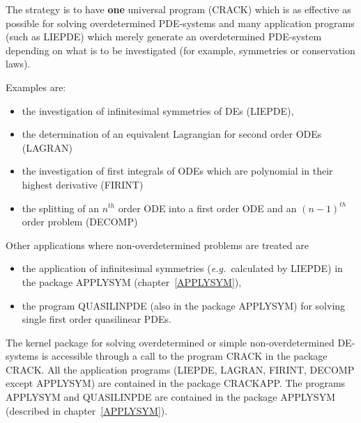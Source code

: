\documentclass[11pt,letterpaper]{book}
\begin{document}
The strategy is to have {\bf one} universal program (CRACK) which
is as effective as possible for solving overdetermined PDE-systems
and many application programs (such as LIEPDE) which merely generate an
overdetermined PDE-system depending on what is to be investigated
(for example, symmetries or conservation laws).

Examples are:
\begin{itemize}
\item the investigation of infinitesimal symmetries of DEs (LIEPDE),
\item the determination of an equivalent Lagrangian for second order
      ODEs (LAGRAN)
\item the investigation of first integrals of ODEs which are polynomial
      in their highest derivative (FIRINT)
\item the splitting of an $n^{th}$ order ODE into a first order ODE and
      an $(n-1)^{th}$ order problem (DECOMP)
\end{itemize}
Other applications where non-overdetermined problems are treated are
\begin{itemize}
\item the application of infinitesimal symmetries ({\em e.g.\
      }calculated by LIEPDE) in the package APPLYSYM (chapter~\ref{APPLYSYM}),
\item the program QUASILINPDE (also in the package APPLYSYM)
      for solving single first order quasilinear PDEs.
\end{itemize}
The kernel package for solving overdetermined or simple non-overdetermined
DE-systems is accessible through a call to the program CRACK
in the package CRACK.  All the application programs (LIEPDE, LAGRAN,
FIRINT, DECOMP except APPLYSYM) are contained in the package CRACKAPP.
The programs APPLYSYM and QUASILINPDE are contained in the package
APPLYSYM (described in chapter~\ref{APPLYSYM}).

\end{document}
